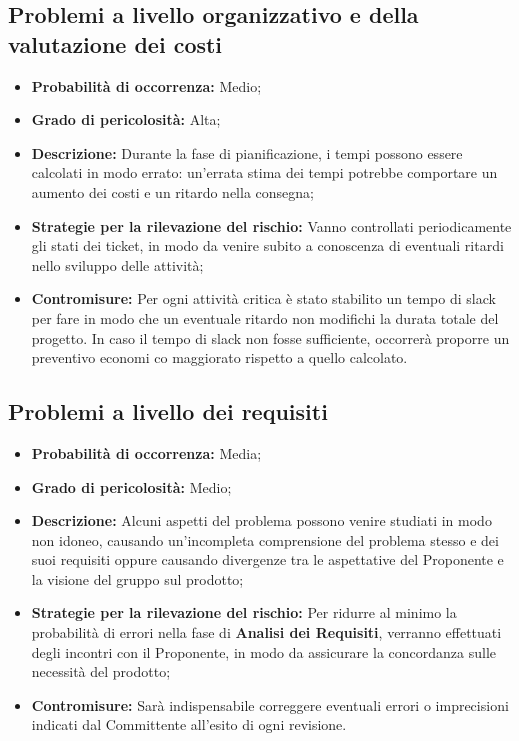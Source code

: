 	\subsection{Problemi a livello organizzativo e della valutazione dei costi}
	\begin{itemize}
		\item \textbf{Probabilità di occorrenza:} Medio; \\
		\item \textbf{Grado di pericolosità:} Alta; \\
		\item \textbf{Descrizione:} Durante la fase di pianificazione, i tempi possono essere calcolati in modo errato: un'errata stima dei tempi potrebbe comportare un aumento dei costi e un ritardo nella consegna; \\
		\item \textbf{Strategie per la rilevazione del rischio:} Vanno controllati periodicamente gli stati dei ticket, in modo da venire subito a conoscenza di eventuali ritardi nello sviluppo delle attività; \\
		\item \textbf{Contromisure:} Per ogni attività critica è stato stabilito un tempo di slack per fare in modo che un eventuale ritardo non modifichi la durata totale del progetto. In caso il tempo di slack non fosse sufficiente, occorrerà proporre un preventivo economi co maggiorato rispetto a quello calcolato. \\
	\end{itemize}
	\subsection{Problemi a livello dei requisiti}
	\begin{itemize}
		\item \textbf{Probabilità di occorrenza:} Media; \\
		\item \textbf{Grado di pericolosità:} Medio; \\
		\item \textbf{Descrizione:} Alcuni aspetti del problema possono venire studiati in modo non idoneo, causando un'incompleta comprensione del problema stesso e dei suoi requisiti oppure causando divergenze tra le aspettative del Proponente e la visione del gruppo sul prodotto; \\
		\item \textbf{Strategie per la rilevazione del rischio:} Per ridurre al minimo la probabilità di errori nella fase di \textbf{Analisi dei Requisiti}, verranno effettuati degli incontri con il Proponente, in modo da assicurare la concordanza sulle necessità del prodotto; \\
		\item \textbf{Contromisure:} Sarà indispensabile correggere eventuali errori o imprecisioni indicati dal Committente all'esito di ogni revisione.
	\end{itemize}